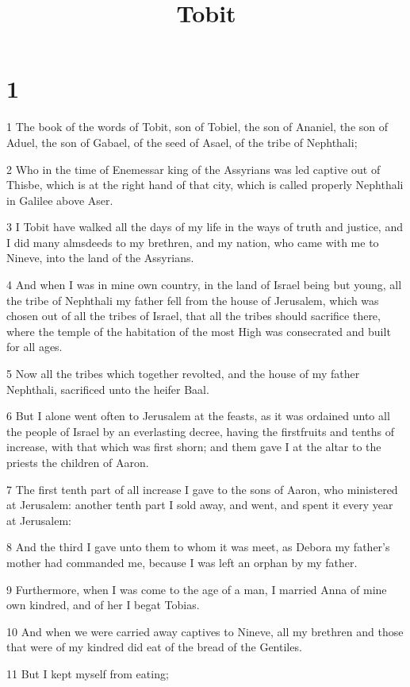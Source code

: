 

\title{Tobit}


\chapter{1}

\par 1 The book of the words of Tobit, son of Tobiel, the son of Ananiel, the son of Aduel, the son of Gabael, of the seed of Asael, of the tribe of Nephthali;
\par 2 Who in the time of Enemessar king of the Assyrians was led captive out of Thisbe, which is at the right hand of that city, which is called properly Nephthali in Galilee above Aser.
\par 3 I Tobit have walked all the days of my life in the ways of truth and justice, and I did many almsdeeds to my brethren, and my nation, who came with me to Nineve, into the land of the Assyrians.
\par 4 And when I was in mine own country, in the land of Israel being but young, all the tribe of Nephthali my father fell from the house of Jerusalem, which was chosen out of all the tribes of Israel, that all the tribes should sacrifice there, where the temple of the habitation of the most High was consecrated and built for all ages.
\par 5 Now all the tribes which together revolted, and the house of my father Nephthali, sacrificed unto the heifer Baal.
\par 6 But I alone went often to Jerusalem at the feasts, as it was ordained unto all the people of Israel by an everlasting decree, having the firstfruits and tenths of increase, with that which was first shorn; and them gave I at the altar to the priests the children of Aaron.
\par 7 The first tenth part of all increase I gave to the sons of Aaron, who ministered at Jerusalem: another tenth part I sold away, and went, and spent it every year at Jerusalem:
\par 8 And the third I gave unto them to whom it was meet, as Debora my father's mother had commanded me, because I was left an orphan by my father.
\par 9 Furthermore, when I was come to the age of a man, I married Anna of mine own kindred, and of her I begat Tobias.
\par 10 And when we were carried away captives to Nineve, all my brethren and those that were of my kindred did eat of the bread of the Gentiles.
\par 11 But I kept myself from eating;
